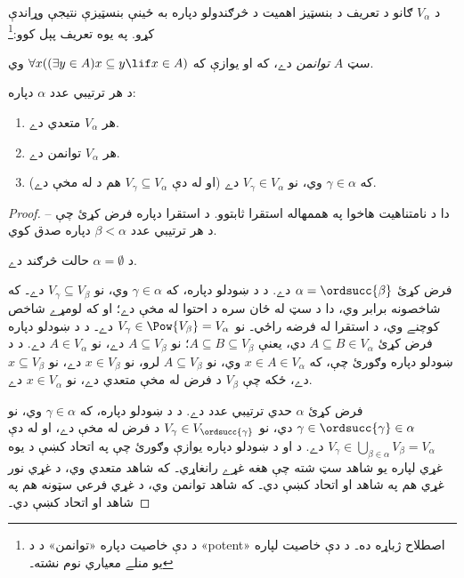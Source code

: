 \documentclass[../../../include/open-logic-section]{subfiles}
\begin{document}

د $V_\alpha$ ګانو د تعريف د بنسټيز اهميت د څرګندولو دپاره به ځينې
بنسټيزې نتيجې وړاندې کړو. په يوه تعريف پېل کوو:\footnote{د دې خاصيت
دپاره «توانمن» د \citet{ButtonLT1} د «potent» اصطلاح
ژباړه ده۔ د دې خاصيت لپاره يو منلے معياري نوم نشته۔}
\begin{defn}
	سټ $A$ \emph{توانمن} دے، که او يوازې که $\forall x((\exists y \in A)x \subseteq y \lif x \in A)$ وي.
\end{defn}
\begin{lem}
د هر ترتيبي عدد $\alpha$ دپاره:
\begin{enumerate}
	\item{} هر $V_\alpha$ متعدي دے.
	\item{} هر $V_\alpha$ توانمن دے.
	\item{} که $\gamma \in \alpha$ وي، نو $V_\gamma
	\in V_\alpha$ دے (او له دې $V_\gamma \subseteq V_\alpha$ هم د
	 له مخې دے).
\end{enumerate}
\end{lem}

\begin{proof}
دا د نامتناهيت هاخوا په هممهاله استقرا ثابتوو. د استقرا دپاره فرض کړئ
چې -- د هر ترتيبي عدد $\beta < \alpha$
دپاره صدق کوي.

د $\alpha = \emptyset$ حالت څرګند دے.

فرض کړئ $\alpha = \ordsucc{\beta}$ دے. د  د ښودلو
دپاره، که $\gamma \in \alpha$ وي، نو $V_\gamma \subseteq V_\beta$ دے۔
که شاخصونه برابر وي، دا د سټ له ځان سره د احتوا له مخې
دے؛ او که لومړے شاخص کوچنے وي، د استقرا له فرضه راځي۔
نو $V_\gamma \in \Pow{V_\beta} = V_\alpha$ دے۔
د  د ښودلو دپاره فرض کړئ $A \subseteq B \in V_\alpha$
دي، يعنې $A
\subseteq B \subseteq V_\beta$؛ نو $A \subseteq V_\beta$ دے، نو $A \in
V_\alpha$ دے. د  د ښودلو دپاره وګورئ چې، که $x \in A \in
V_\alpha$ وي، نو $A \subseteq V_\beta$ لرو، نو $x \in V_\beta$ دے، نو
$x
\subseteq V_\beta$ دے، ځکه چې $V_\beta$ د فرض له مخې متعدي دے، نو $x
\in V_\alpha$ دے.

فرض کړئ $\alpha$ حدي ترتيبي عدد دے. د  د ښودلو
دپاره، که $\gamma \in \alpha$ وي، نو $\gamma \in \ordsucc{\gamma} \in \alpha$
دي، نو $V_\gamma \in V_{\ordsucc{\gamma}}$ د فرض له مخې دے، او له دې
$V_\gamma \in \bigcup_{\beta \in \alpha} V_\beta = V_\alpha$ دے.
د  او  د ښودلو دپاره يوازې وګورئ
چې په اتحاد کښې د يوه غړي لپاره يو شاهد سټ شته چې هغه
غړے رانغاړي۔ که شاهد متعدي وي، د غړي نور غړي هم په شاهد
او اتحاد کښې دي۔ که شاهد توانمن وي، د غړي فرعي سټونه هم
په شاهد او اتحاد کښې دي۔
\end{proof}
\end{document}
